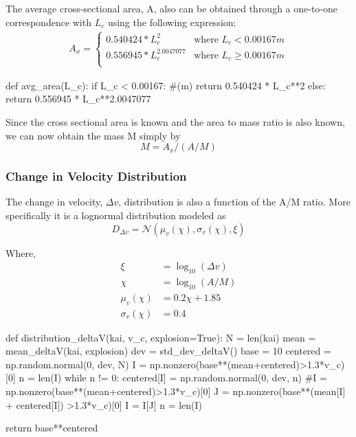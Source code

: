 \documentclass{article}
\newenvironment{code}{\captionsetup{type=listing}}{}
\begin{document}
The average cross-sectional area, A, also can be obtained through a one-to-one correspondence with $L_c$ using the following expression:
\begin{align}
	A_x = \begin{cases}
		0.540424 * L_c^2 & \text{where } L_c < 0.00167 m \\
		0.556945 * L_c^{2.0047077} & \text{where } L_c \geq 0.00167 m \\
	\end{cases}
\end{align}

\begin{code}
	\begin{tcbpythoncode}
		def avg_area(L_c):
		if L_c < 0.00167: #(m)
		return 0.540424 * L_c**2
		else:
		return 0.556945 * L_c**2.0047077
	\end{tcbpythoncode}
\end{code}

Since the cross sectional area is known and the area to mass ratio is also known, we can now obtain the mass M simply by $$M = A_x / (A/M)$$

\subsubsection{Change in Velocity Distribution }
\noindent The change in velocity, $\Delta v$, distribution is also a function of the A/M ratio. More specifically it is a lognormal distribution modeled as $$D_{\Delta v}= \mathcal{N}(\mu_{v}(\chi), \sigma_{v}(\chi), \xi)$$

\noindent Where, \begin{align}
	\xi &= \log_{10}(\Delta v)\\
	\chi &= \log_{10}(A/M)\\
	\mu_{v}(\chi) &= 0.2\chi+1.85\\
	 \sigma_{v}(\chi) &= 0.4
\end{align}

\begin{code}
	\begin{tcbpythoncode}
		def distribution_deltaV(kai, v_c, explosion=True):
		N = len(kai)
		mean = mean_deltaV(kai, explosion)
		dev = std_dev_deltaV()
		base = 10
		centered = np.random.normal(0, dev, N)
		I = np.nonzero(base**(mean+centered)>1.3*v_c)[0]
		n = len(I)
		while n != 0:
			centered[I] = np.random.normal(0, dev, n)
			#I = np.nonzero(base**(mean+centered)>1.3*v_c)[0]
			J = np.nonzero(base**(mean[I] + centered[I]) >1.3*v_c)[0]
			I = I[J]
			n = len(I)
		
		return base**centered
	\end{tcbpythoncode}
\end{code}
\end{document}
